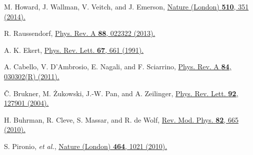 \documentclass[prl,letterpaper,english,reprint,nofootinbib,aps,superscriptaddress,showpacs,showkeys]{revtex4-1}
\theoremstyle{definition}
\theoremstyle{remark}
\begin{document}
\begin{thebibliography}{10}

 M. Howard, J. Wallman, V. Veitch, and J. Emerson,
\href{https://www.nature.com/articles/nature13460}
{Nature (London) \textbf{510}, 351 (2014).}




 R. Raussendorf,
 \href{http://link.aps.org/doi/10.1103/PhysRevA.88.022322}{Phys. Rev. A \textbf{88}, 022322 (2013).}




 A. K. Ekert,
 \href{http://journals.aps.org/prl/abstract/10.1103/PhysRevLett.67.661}{Phys. Rev. Lett. \textbf{67}, 661 (1991).}

 A. Cabello, V. D'Ambrosio, E. Nagali, and F. Sciarrino,
 \href{http://journals.aps.org/pra/abstract/10.1103/PhysRevA.84.030302}{Phys. Rev. A \textbf{84}, 030302(R) (2011).}


 \v{C}. Brukner, M. \.{Z}ukowski, J.-W. Pan, and A. Zeilinger,
 \href{http://journals.aps.org/prl/abstract/10.1103/PhysRevLett.92.127901}{Phys. Rev. Lett. \textbf{92}, 127901 (2004).}

 H. Buhrman, R. Cleve, S. Massar, and R. de Wolf,
 \href{http://journals.aps.org/rmp/abstract/10.1103/RevModPhys.82.665}{Rev. Mod. Phys. \textbf{82}, 665 (2010).}


 S. Pironio, \emph{et al.},
 \href{http://www.nature.com/nature/journal/v464/n7291/full/nature09008.html}{Nature (London) \textbf{464}, 1021 (2010).}



\end{thebibliography}
\end{document}
